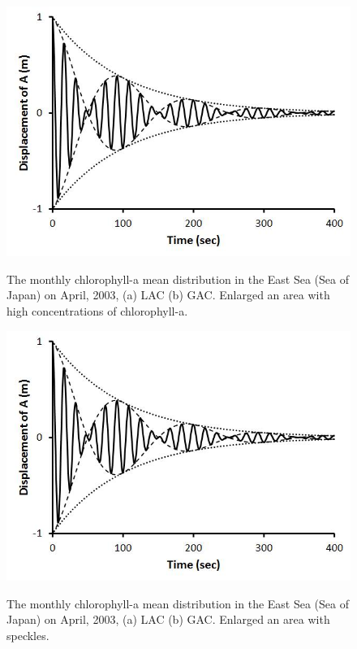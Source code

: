   \begin{figure}[h]
  	\centering
  	\includegraphics[width=0.8\linewidth]{../images/monHISHI}\\
  	\caption{The monthly chlorophyll-a mean distribution in the East Sea (Sea of Japan) on April, 2003, (a) LAC (b) GAC. Enlarged an area with high concentrations of chlorophyll-a.}
  	\label{fig:monHISHI}
  \end{figure}
  
    \begin{figure}[h]
  	\centering
  	\includegraphics[width=0.8\linewidth]{../images/monHISSPEC}\\
  	\caption{The monthly chlorophyll-a mean distribution in the East Sea (Sea of Japan) on April, 2003, (a) LAC (b) GAC. Enlarged an area with speckles.}
  	\label{fig:monHISSPEC}
  \end{figure}
  
